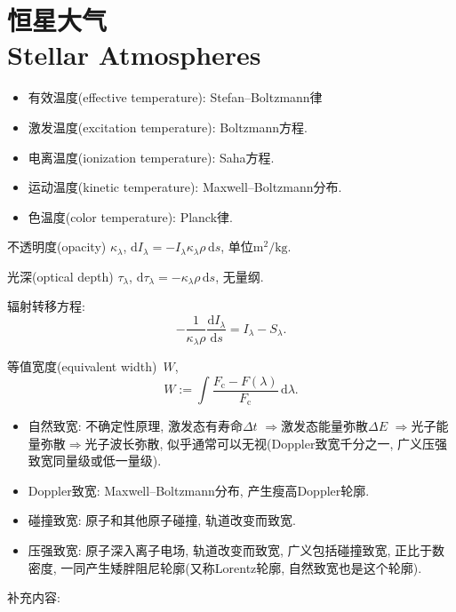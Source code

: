 \chapter{恒星大气\\Stellar Atmospheres}

\begin{itemize}
    \item 有效温度(effective temperature): Stefan--Boltzmann律
    \item 激发温度(excitation temperature): Boltzmann方程.
    \item 电离温度(ionization temperature): Saha方程.
    \item 运动温度(kinetic temperature): Maxwell--Boltzmann分布.
    \item 色温度(color temperature): Planck律.
\end{itemize}

不透明度(opacity) $\kappa_\lambda$, $\mathrm{d}I_\lambda
=-I_\lambda\kappa_\lambda\rho\,\mathrm{d}s$, 单位$\text{m}^2/\text{kg}$.

光深(optical depth) $\tau_\lambda$, $\mathrm{d}\tau_\lambda=-\kappa_\lambda\rho\,\mathrm{d}s$, 无量纲.

辐射转移方程:
\begin{equation*}
    -\frac{1}{\kappa_\lambda\rho}\frac{\mathrm{d}I_\lambda}{\mathrm{d}s}
    =I_\lambda-S_\lambda.
\end{equation*}

等值宽度(equivalent width)~$W$,
\begin{equation*}
    W:=\int\frac{F_\text{c}-F(\lambda)}{F_\text{c}}\,\mathrm{d}\lambda.
\end{equation*}

\begin{itemize}
    \item 自然致宽: 不确定性原理, 激发态有寿命$\Delta t$ $\Rightarrow$激发态能量弥散$\Delta E$ $\Rightarrow$光子能量弥散$\Rightarrow$光子波长弥散, 似乎通常可以无视(Doppler致宽千分之一, 广义压强致宽同量级或低一量级).
    \item Doppler致宽: Maxwell--Boltzmann分布, 产生瘦高Doppler轮廓.
    \item 碰撞致宽: 原子和其他原子碰撞, 轨道改变而致宽.
    \item 压强致宽: 原子深入离子电场, 轨道改变而致宽, 广义包括碰撞致宽, 正比于数密度, 一同产生矮胖阻尼轮廓(又称Lorentz轮廓, 自然致宽也是这个轮廓).
\end{itemize}

补充内容:


